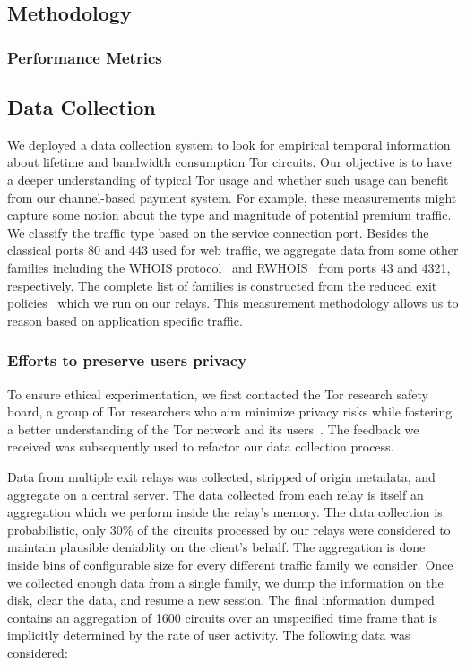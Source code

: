 \subsection{Methodology}

\subsubsection{Performance Metrics}
\subsection{Data Collection}
\label{subsec:datacollection}

We deployed a data collection system to look for empirical temporal information
about lifetime and bandwidth consumption Tor circuits. Our objective is to have
a deeper understanding of typical Tor usage and whether such usage can benefit
from our channel-based payment system. For example, these measurements might
capture some notion about the type and magnitude of potential premium
traffic. We classify the traffic type based on the service connection
port. Besides the classical ports 80 and 443 used for web traffic, we aggregate
data from some other families including the WHOIS protocol~\cite{rfc3912} and
RWHOIS~\cite{rfc2167} from ports 43 and 4321, respectively. The complete list of
families is constructed from the reduced exit
policies~\cite{reducedexitpolicies} which we run on our relays. This measurement
methodology allows us to reason based on application specific traffic.


\subsubsection{Efforts to preserve users privacy}

To ensure ethical experimentation, we first contacted the Tor research safety
board, a group of Tor researchers who aim minimize privacy risks while fostering
a better understanding of the Tor network and its users~\cite{torsafety}. The
feedback we received was subsequently used to refactor our data collection
process.

Data from multiple exit relays was collected, stripped of origin metadata, and
aggregate on a central server. The data collected from each relay is itself an
aggregation which we perform inside the relay's memory. The data collection is
probabilistic, only 30\% of the circuits processed by our relays were considered
to maintain plausible deniablity on the client's behalf. The aggregation is done
inside bins of configurable size for every different traffic family we
consider. Once we collected enough data from a single family, we dump the
information on the disk, clear the data, and resume a new session. The final
information dumped contains an aggregation of 1600 circuits over an unspecified
time frame that is implicitly determined by the rate of user activity. The
following data was considered:


